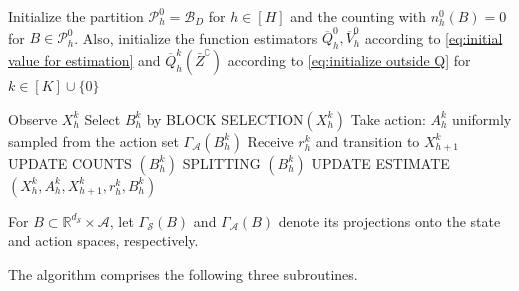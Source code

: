 \documentclass[final,supplement]{siamart251216}
\begin{document}
\begin{algorithm}[H]
\caption{Adaptive Partition and Learning for Diffusions (APL-Diffusion)}\label{alg:ML}
\begin{algorithmic}[1]
\label{Initial Partition} 
Initialize the partition $\mathcal{P}_h^0= \mathcal{B}_{D}$ for $h
\in [H]$ and  the counting with
   $ n_h^0(B)=0$ for  $B \in\mathcal{P}_h^0$.
Also, initialize the function estimators 
$\overline{Q}_h^0,\overline{V}_h^0$ according to \eqref{eq:initial value for estimation} and $\overline{Q}_h^k(\bar{Z}^{\complement})$ according to \eqref{eq:initialize outside Q} for $k\in [K]\cup\{0\}$  

\State Observe $X_h^k$ 
\State \label{block selection} Select $B_h^k$ by BLOCK SELECTION$(X_h^k)$
\State \label{projection operator II} Take action: $A_h^k$ uniformly sampled from the action set $\Gamma_{\mathcal{A}}(B_h^k)$  
\State Receive $r_{h}^k$ and transition to $X_{h+1}^k$ 
\EndFor
{}
\State UPDATE COUNTS $(B_h^k)$
\State SPLITTING $(B_h^k)$
\State UPDATE ESTIMATE $(X_h^k,A_h^k, X_{h+1}^k,r_{h}^k,B_h^k)$ 
\EndFor
\EndFor

\end{algorithmic}
\end{algorithm}

 For $B\subset\mathbb R^{d_{\mathcal S}}\times\mathcal A$, let
$\Gamma_{\mathcal S}(B)$ and $\Gamma_{\mathcal A}(B)$ denote its projections
onto the state and action spaces, respectively. 

\vspace{10pt}

The algorithm comprises the following three subroutines.
\end{document}
